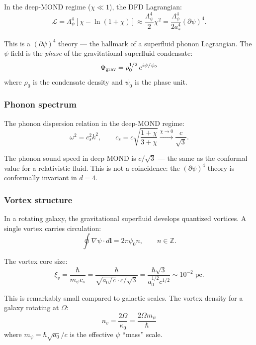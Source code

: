 \documentclass[11pt,a4paper]{article}
\begin{document}
In the deep-MOND regime ($\chi \ll 1$), the DFD Lagrangian:
\begin{equation}
\mathcal{L} = \Lambda_\psi^4\left[\chi - \ln(1+\chi)\right] \approx \frac{\Lambda_\psi^4}{2}\chi^2 = \frac{\Lambda_\psi^4}{2a_*^4}(\partial\psi)^4.
\end{equation}

This is a $(\partial\psi)^4$ theory --- the hallmark of a superfluid phonon Lagrangian. The $\psi$ field is the \emph{phase} of the gravitational superfluid condensate:
\begin{equation}
\Phi_{\rm grav} = \rho_0^{1/2}\,e^{i\psi/\psi_0}
\end{equation}
where $\rho_0$ is the condensate density and $\psi_0$ is the phase unit.

\subsubsection{Phonon spectrum}

The phonon dispersion relation in the deep-MOND regime:
\begin{equation}
\omega^2 = c_s^2 k^2, \qquad c_s = c\sqrt{\frac{1+\chi}{3+\chi}} \xrightarrow{\chi\to 0} \frac{c}{\sqrt{3}}.
\end{equation}

The phonon sound speed in deep MOND is $c/\sqrt{3}$ --- the same as the conformal value for a relativistic fluid. This is not a coincidence: the $(\partial\psi)^4$ theory is conformally invariant in $d=4$.

\subsubsection{Vortex structure}

In a rotating galaxy, the gravitational superfluid develops quantized vortices. A single vortex carries circulation:
\begin{equation}
\oint \nabla\psi\cdot d\mathbf{l} = 2\pi\psi_0 n, \qquad n \in \mathbb{Z}.
\end{equation}

The vortex core size:
\begin{equation}
\xi_v = \frac{\hbar}{m_\psi c_s} = \frac{\hbar}{\sqrt{a_0/c}\cdot c/\sqrt{3}} = \frac{\hbar\sqrt{3}}{a_0^{1/2}c^{1/2}} \sim 10^{-2}\;\text{pc}.
\end{equation}

This is remarkably small compared to galactic scales. The vortex density for a galaxy rotating at $\Omega$:
\begin{equation}
n_v = \frac{2\Omega}{\kappa_0} = \frac{2\Omega m_\psi}{\hbar}
\end{equation}
where $m_\psi = \hbar\sqrt{a_0}/c$ is the effective $\psi$ ``mass'' scale.
\end{document}
